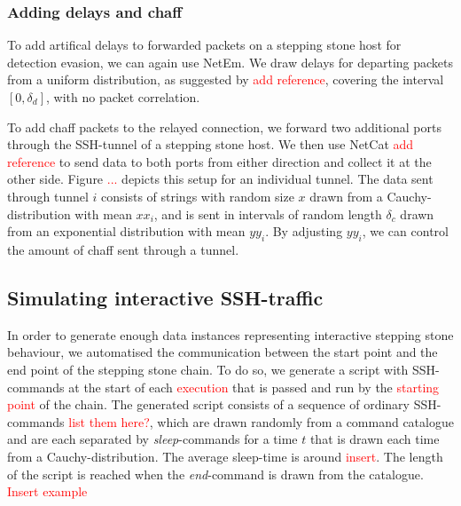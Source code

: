 \documentclass[conference]{IEEEtran}\usepackage[]{graphicx}\usepackage[]{color}
\begin{document}







\subsubsection{Adding delays and chaff}

To add artifical delays to forwarded packets on a stepping stone host for detection evasion, we can again use NetEm. We draw delays for departing packets from a uniform distribution, as suggested by \textcolor{red}{add reference}, covering the interval $[0,\delta_d]$, with no packet correlation. 

To add chaff packets to the relayed connection, we forward two additional ports through the SSH-tunnel of a stepping stone host. We then use NetCat \textcolor{red}{add reference} to send data to both ports from either direction and collect it at the other side. Figure \textcolor{red}{...} depicts this setup for an individual tunnel. 
The data sent through tunnel $i$ consists of strings with random size $x$ drawn from a Cauchy-distribution with mean $xx_i$, and is sent in intervals of random length $\delta_c$ drawn from an exponential distribution with mean $yy_i$. By adjusting $yy_i$, we can control the amount of chaff sent through a tunnel. 

\subsection{Simulating interactive SSH-traffic}

In order to generate enough data instances representing interactive stepping stone behaviour, we automatised the communication between the start point and the end point of the stepping stone chain. To do so, we generate a script with SSH-commands at the start of each \textcolor{red}{execution} that is passed and run by the \textcolor{red}{starting point} of the chain. The generated script consists of a sequence of ordinary SSH-commands \textcolor{red}{list them here?}, which are drawn randomly from a command catalogue and are each separated by \textit{sleep}-commands for a time $t$ that is drawn each time from a Cauchy-distribution. The average sleep-time is around \textcolor{red}{insert}. The length of the script is reached when the \textit{end}-command is drawn from the catalogue.
\textcolor{red}{Insert example}
\end{document}
